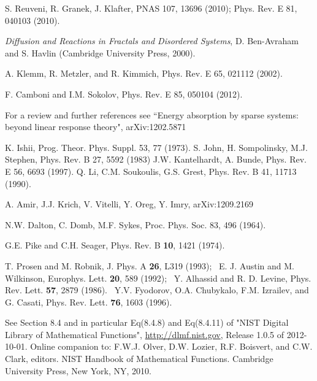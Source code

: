 \documentclass[aps,pre,floats,floatfix,twocolumn]{revtex4}
\newcommand{\rmrk}[1]{#1}
\begin{document}
\begin{thebibliography}{99}
S. Reuveni, R. Granek, J. Klafter, PNAS 107, 13696 (2010);
Phys. Rev. E 81, 040103 (2010).

{\em Diffusion and Reactions in Fractals and Disordered Systems},
D. Ben-Avraham and S. Havlin (Cambridge University Press, 2000).


\rmrk{A. Klemm, R. Metzler, and R. Kimmich,} 
Phys. Rev. E 65, 021112 (2002).



\rmrk{F. Camboni and I.M. Sokolov,}
Phys. Rev. E 85, 050104 (2012).


For a review and further references 
see ``Energy absorption by sparse systems: 
beyond linear response theory",	arXiv:1202.5871  





K. Ishii, 
Prog. Theor. Phys. Suppl. 53, 77 (1973).
%
%
S. John, H. Sompolinsky, M.J. Stephen,  
Phys. Rev. B 27, 5592 (1983) 
%
%
J.W. Kantelhardt, A. Bunde, 
Phys. Rev. E 56, 6693 (1997).
%
%
Q. Li, C.M. Soukoulis, G.S. Grest,
Phys. Rev. B 41, 11713 (1990).  


\rmrk{A. Amir, J.J. Krich, V. Vitelli, Y. Oreg, Y. Imry,} 
arXiv:1209.2169



\rmrk{N.W. Dalton, C. Domb, M.F. Sykes,} 
Proc. Phys. Soc. 83, 496 (1964).

\rmrk{G.E. Pike and C.H. Seager,} 
Phys. Rev. B {\bf 10}, 1421 (1974).



T. Prosen and M. Robnik, J. Phys. A {\bf 26}, L319 (1993); \
E. J. Austin and M. Wilkinson, Europhys. Lett. {\bf 20}, 589 (1992); \ 
Y. Alhassid and R. D. Levine, Phys. Rev. Lett. {\bf 57}, 2879 (1986). \
Y.V. Fyodorov, O.A. Chubykalo, F.M. Izrailev, and G. Casati, 
Phys. Rev. Lett. {\bf 76}, 1603 (1996).


See Section 8.4 and in particular Eq(8.4.8) and Eq(8.4.11)
of "NIST Digital Library of Mathematical Functions",
\url{http://dlmf.nist.gov}, Release 1.0.5 of 2012-10-01.
Online companion to:
F.W.J. Olver, D.W. Lozier, R.F. Boisvert, and C.W. Clark, editors.
NIST Handbook of Mathematical Functions.
Cambridge University Press, New York, NY, 2010.


\end{thebibliography}
\end{document}
